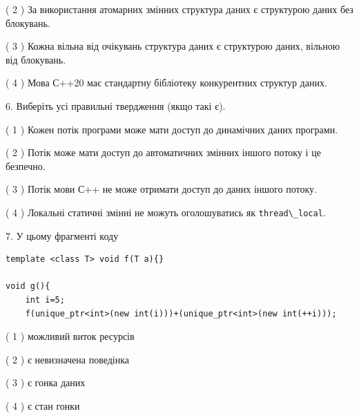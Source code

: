 \documentclass[12pt, ukrainian]{article}
\def\code#1{\Verb!#1!}
\begin{document}
\begin {large}
{( 2 ) За використання атомарних змінних структура даних є структурою даних без блокувань.%

( 3 ) Кожна вільна від очікувань структура даних є структурою даних, вільною від блокувань.%

( 4 ) Мова С++20 має стандартну бібліотеку конкурентних структур даних.%
\newpage



\vspace{5mm}
6. Виберіть усі правильні твердження (якщо такі є).\par
\vspace{2mm}

( 1 ) Кожен потік програми може мати доступ до динамічних даних програми.%

( 2 ) Потік може мати доступ до автоматичних змінних іншого потоку і це безпечно.%

( 3 ) Потік мови С++ не може отримати доступ до даних іншого потоку.%

( 4 ) Локальні статичні змінні не можуть оголошуватись як \code{thread\_local}.%


\vspace{5mm}
7. У цьому фрагменті коду
\begin{verbatim}
template <class T> void f(T a){}

void g(){
    int i=5;
    f(unique_ptr<int>(new int(i)))+(unique_ptr<int>(new int(++i)));
\end{verbatim}
( 1 ) можливий виток ресурсів%

( 2 ) є невизначена поведінка%

( 3 ) є гонка даних%

( 4 ) є стан гонки%
}
\end {large}
\end{document}
